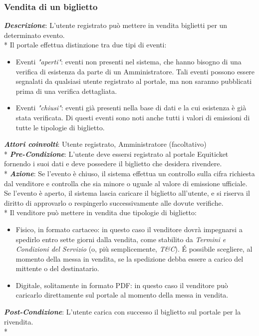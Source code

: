 \subsubsection{Vendita di un biglietto}
\textbf{\textit{Descrizione}}: L'utente registrato può mettere in vendita biglietti per un determinato evento. \\* 
Il portale effettua distinzione tra due tipi di eventi: 
\begin{itemize}
\item Eventi \textit{"aperti"}: eventi non presenti nel sistema, che hanno bisogno di una verifica di esistenza da parte di un Amministratore. Tali eventi possono essere segnalati da qualsiasi utente registrato al portale, ma non saranno pubblicati prima di una verifica dettagliata. 
\item Eventi \textit{"chiusi"}: eventi già presenti nella base di dati e la cui esistenza è già stata verificata. Di questi eventi sono noti anche tutti i valori di emissioni di tutte le tipologie di biglietto.
\end{itemize}
\textbf{\textit{Attori coinvolti}}: Utente registrato, Amministratore (facoltativo) \\*
\textbf{\textit{Pre-Condizione}}: L'utente deve essersi registrato al portale Equiticket fornendo i suoi dati e deve possedere il biglietto che desidera rivendere. \\*
\textbf{\textit{Azione}}: Se l'evento è chiuso, il sistema effettua un controllo sulla cifra richiesta dal venditore e controlla che sia minore o uguale al valore di emissione ufficiale. Se l'evento è aperto, il sistema lascia caricare il biglietto all'utente, e si riserva il diritto di approvarlo o respingerlo successivamente alle dovute verifiche. \\*
Il venditore può mettere in vendita due tipologie di biglietto: 
\begin{itemize}
\item Fisico, in formato cartaceo: in questo caso il venditore dovrà impegnarsi a spedirlo entro sette giorni dalla vendita, come stabilito da \textit{Termini e Condizioni del Servizio} (o, più semplicemente, \textit{T\&C}). \'E possibile scegliere, al momento della messa in vendita, se la spedizione debba essere a carico del mittente o del destinatario.
\item Digitale, solitamente in formato PDF: in questo caso il venditore può caricarlo direttamente sul portale al momento della messa in vendita.
\end{itemize}
\textbf{\textit{Post-Condizione}}: L'utente carica con successo il biglietto sul portale per la rivendita. \\*

